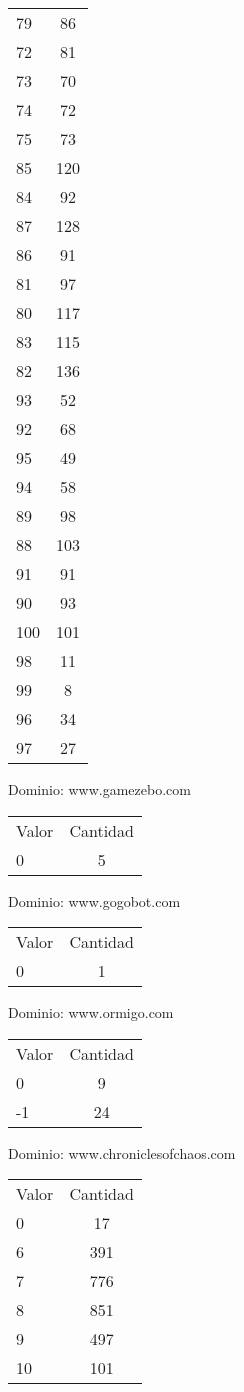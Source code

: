 \begin{tabular}{| l | c |}
 79 & 86\\
 72 & 81\\
 73 & 70\\
 74 & 72\\
 75 & 73\\
 85 & 120\\
 84 & 92\\
 87 & 128\\
 86 & 91\\
 81 & 97\\
 80 & 117\\
 83 & 115\\
 82 & 136\\
 93 & 52\\
 92 & 68\\
 95 & 49\\
 94 & 58\\
 89 & 98\\
 88 & 103\\
 91 & 91\\
 90 & 93\\
 100 & 101\\
 98 & 11\\
 99 & 8\\
 96 & 34\\
 97 & 27
\end{tabular}

Dominio: www.gamezebo.com\\
\begin{tabular}{| l | c |}
 Valor & Cantidad\\
 0 & 5\\
\end{tabular}

Dominio: www.gogobot.com\\
\begin{tabular}{| l | c |}
 Valor & Cantidad\\
 0 & 1\\
\end{tabular}

Dominio: www.ormigo.com\\
\begin{tabular}{| l | c |}
 Valor & Cantidad\\
 0 & 9\\
 -1 & 24
\end{tabular}

Dominio: www.chroniclesofchaos.com\\
\begin{tabular}{| l | c |}
 Valor & Cantidad\\
 0 & 17\\
 6 & 391\\
 7 & 776\\
 8 & 851\\
 9 & 497\\
 10 & 101\\
\end{tabular}

